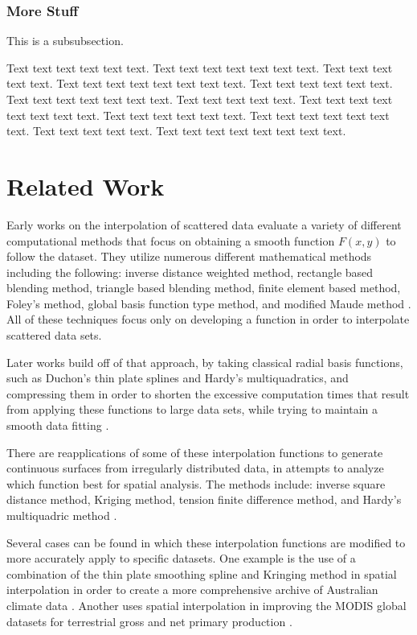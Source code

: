 \documentclass{sig-alternate}
\begin{document}
\subsubsection{More Stuff}
This is a subsubsection.

Text text text text text text. Text text text text text text text. Text text text text text. Text text text text text text text text. Text text text text text text. Text text text text text text text. Text text text text text. Text text text text text text text text. Text text text text text text. Text text text text text text text. Text text text text text. Text text text text text text text text.

\section{Related Work}
Early works on the interpolation of scattered data evaluate a variety of different computational methods that focus on obtaining a smooth function $F(x, y)$ to follow the dataset. They utilize numerous different mathematical methods including the following: inverse distance weighted method, rectangle based blending method, triangle based blending method, finite element based method, Foley's method, global basis function type method, and modified Maude method \cite{franke1982scattered}. All of these techniques focus only on developing a function in order to interpolate scattered data sets.

Later works build off of that approach, by taking classical radial basis functions, such as Duchon's thin plate splines and Hardy's multiquadratics, and compressing them in order to shorten the excessive computation times that result from applying these functions to large data sets, while trying to maintain a smooth data fitting \cite{floater1996multistep}.

There are reapplications of some of these interpolation functions to generate continuous surfaces from irregularly distributed data, in attempts to analyze which function best for spatial analysis. The methods include: inverse square distance method, Kriging method, tension finite difference method, and Hardy's multiquadric method \cite{caruso1998interpolation}. 

Several cases can be found in which these interpolation functions are modified to more accurately apply to specific datasets. One example is the use of a combination of the thin plate smoothing spline and Kringing method in spatial interpolation in order to create a more comprehensive archive of Australian climate data \cite{jeffrey2001using}. Another uses spatial interpolation in improving the MODIS global datasets for terrestrial gross and net primary production \cite{zhao2005improvements}.
\end{document}
